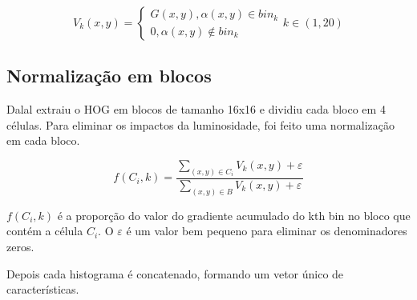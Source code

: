 \[
V_{k}(x,y) = \left\{\begin{matrix}
G(x,y), \alpha (x,y)  \in bin_{k}\\ 
0, \alpha (x,y) \notin bin_{k}
\end{matrix}\right. k \in (1,20)
\]

\subsection{Normalização em blocos}

Dalal extraiu o HOG em blocos de tamanho 16x16 e dividiu cada bloco em 4 células. Para eliminar os impactos da luminosidade, foi feito uma normalização em cada bloco.

\[
f(C_{i},k) = \frac
{\sum_{(x,y) \in C_i}V_k(x,y) + \varepsilon}
{\sum_{(x,y) \in B}V_k(x,y) + \varepsilon}
\]

\(f(C_i,k)\) é a proporção do valor do gradiente acumulado do kth bin no bloco que contém a célula \(C_i\). O \(\varepsilon\) é um valor bem pequeno para eliminar os denominadores zeros.

Depois cada histograma é concatenado, formando um vetor único de características.

%



